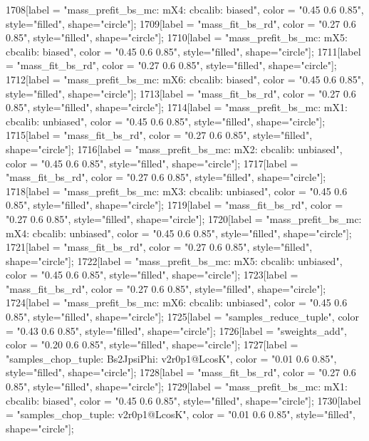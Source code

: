 {	1708[label = "mass_prefit_bs_mc\nmassbin: mX4\nmassmodel: cbcalib\ntrigger: biased", color = "0.45 0.6 0.85", style="filled", shape="circle"];
	1709[label = "mass_fit_bs_rd", color = "0.27 0.6 0.85", style="filled", shape="circle"];
	1710[label = "mass_prefit_bs_mc\nmassbin: mX5\nmassmodel: cbcalib\ntrigger: biased", color = "0.45 0.6 0.85", style="filled", shape="circle"];
	1711[label = "mass_fit_bs_rd", color = "0.27 0.6 0.85", style="filled", shape="circle"];
	1712[label = "mass_prefit_bs_mc\nmassbin: mX6\nmassmodel: cbcalib\ntrigger: biased", color = "0.45 0.6 0.85", style="filled", shape="circle"];
	1713[label = "mass_fit_bs_rd", color = "0.27 0.6 0.85", style="filled", shape="circle"];
	1714[label = "mass_prefit_bs_mc\nmassbin: mX1\nmassmodel: cbcalib\ntrigger: unbiased", color = "0.45 0.6 0.85", style="filled", shape="circle"];
	1715[label = "mass_fit_bs_rd", color = "0.27 0.6 0.85", style="filled", shape="circle"];
	1716[label = "mass_prefit_bs_mc\nmassbin: mX2\nmassmodel: cbcalib\ntrigger: unbiased", color = "0.45 0.6 0.85", style="filled", shape="circle"];
	1717[label = "mass_fit_bs_rd", color = "0.27 0.6 0.85", style="filled", shape="circle"];
	1718[label = "mass_prefit_bs_mc\nmassbin: mX3\nmassmodel: cbcalib\ntrigger: unbiased", color = "0.45 0.6 0.85", style="filled", shape="circle"];
	1719[label = "mass_fit_bs_rd", color = "0.27 0.6 0.85", style="filled", shape="circle"];
	1720[label = "mass_prefit_bs_mc\nmassbin: mX4\nmassmodel: cbcalib\ntrigger: unbiased", color = "0.45 0.6 0.85", style="filled", shape="circle"];
	1721[label = "mass_fit_bs_rd", color = "0.27 0.6 0.85", style="filled", shape="circle"];
	1722[label = "mass_prefit_bs_mc\nmassbin: mX5\nmassmodel: cbcalib\ntrigger: unbiased", color = "0.45 0.6 0.85", style="filled", shape="circle"];
	1723[label = "mass_fit_bs_rd", color = "0.27 0.6 0.85", style="filled", shape="circle"];
	1724[label = "mass_prefit_bs_mc\nmassbin: mX6\nmassmodel: cbcalib\ntrigger: unbiased", color = "0.45 0.6 0.85", style="filled", shape="circle"];
	1725[label = "samples_reduce_tuple", color = "0.43 0.6 0.85", style="filled", shape="circle"];
	1726[label = "sweights_add", color = "0.20 0.6 0.85", style="filled", shape="circle"];
	1727[label = "samples_chop_tuple\nmode: Bs2JpsiPhi\nversion: v2r0p1@LcosK", color = "0.01 0.6 0.85", style="filled", shape="circle"];
	1728[label = "mass_fit_bs_rd", color = "0.27 0.6 0.85", style="filled", shape="circle"];
	1729[label = "mass_prefit_bs_mc\nmassbin: mX1\nmassmodel: cbcalib\ntrigger: biased", color = "0.45 0.6 0.85", style="filled", shape="circle"];
	1730[label = "samples_chop_tuple\nversion: v2r0p1@LcosK", color = "0.01 0.6 0.85", style="filled", shape="circle"];
}
